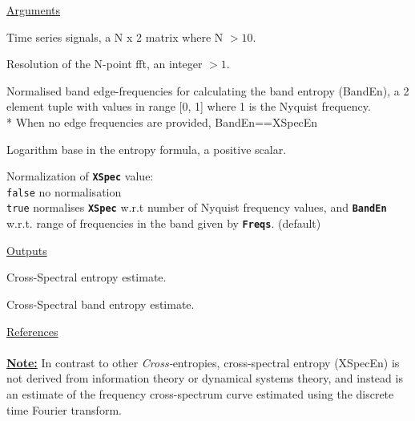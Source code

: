 \documentclass[12pt, a4paper, titlepage, openany]{book}
\begin{document}
\noindent \ul{Arguments}
\begin{description}[labelsep=1cm, labelwidth=2cm, nosep, style=multiline,leftmargin=3cm]\footnotesize
\item[\texttt{Sig}]		Time series signals, a N x 2 matrix where N $> 10$.
\item[\texttt{N}]		Resolution of the N-point fft, an integer $> 1$.
\item[\texttt{Freqs}]	Normalised band edge-frequencies for calculating the band entropy (BandEn), a 2 element tuple with values in range [0, 1] where 1 is the Nyquist frequency. \\
		* When no edge frequencies are provided, BandEn==XSpecEn
\item[\texttt{Logx}]	Logarithm base in the entropy formula, a positive scalar.
\item[\texttt{Norm}]	Normalization of \texttt{\textbf{XSpec}} value:\\
		  \texttt{false} \hspace{10pt} no normalisation \\
		  \texttt{true} \hspace{15pt}  normalises \texttt{\textbf{XSpec}} w.r.t number of Nyquist frequency values, and \texttt{\textbf{BandEn}} w.r.t. range of frequencies in the band given by \texttt{\textbf{Freqs}}. (default)
\end{description}

\noindent \ul{Outputs}
\begin{description}[labelsep=1cm, labelwidth=2cm, nosep, style=multiline,leftmargin=3cm]\footnotesize
\item[\texttt{XSpec}]		Cross-Spectral entropy estimate.
\item[\texttt{BandEn}]		Cross-Spectral band entropy estimate.
\end{description}

\noindent \ul{References}\hspace{1cm}
\cite{Matt1}
\\ \ \\
\noindent\ul{\textbf{Note:}}\hspace{5mm} In contrast to other \textit{Cross-}entropies, cross-spectral entropy (XSpecEn) is not derived from information theory or dynamical systems theory, and instead is an estimate of the frequency cross-spectrum curve estimated using the discrete time Fourier transform.


\newpage
\end{document}
